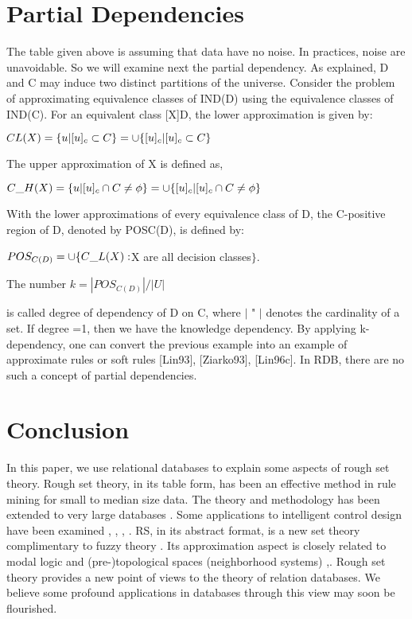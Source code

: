 \documentclass[12pt]{article}
\begin{document}
\section{Partial Dependencies}
The table given above is assuming that data have no noise. In practices,  noise are unavoidable. So we will examine next the partial dependency.  As explained,  D and C may induce two distinct partitions of the universe.  Consider the problem of approximating equivalence classes of  IND(D) using the equivalence classes of IND(C).  For an equivalent class [X]D, the lower approximation is given by:

$C$\textunderscore $L (X)  = \{u \space | \space [u]_c \subset C \}  = \cup \{ [u]_c | [u]_c \subset C \}$\newline

\noindent The upper approximation of X is defined as,

$C \mbox{\textunderscore} H(X)  =  \{u \space | \space [u]_c \cap C \neq \phi \} = \cup \{ [u]_c | [u]_c  \cap C \neq \phi \}$ \newline

\noindent With the lower approximations of every equivalence class of D, the C-positive region of D, denoted by  POSC(D), is defined by:

$POS_{C(D)} = \cup \{ C \mbox{\textunderscore} L(X) : $X are all decision classes$\}$. \newline

\noindent The number 
$k = | POS_{C(D)} | / |U|$

is called degree of dependency of D on C, where $|$ " $|$ denotes the cardinality of a set.  If degree =1, then we have the knowledge dependency. By applying k-dependency, one can convert the previous example into an example of approximate rules or soft rules [Lin93], [Ziarko93], [Lin96c]. In RDB, there are no such a concept of partial dependencies.

\section{Conclusion}
In this paper, we use relational databases to explain some aspects of rough set theory.  Rough set theory, in its table form, has been an effective method in rule mining for small to median size data. The theory and methodology has been extended to very large databases \cite{Lin96b}. Some applications to intelligent control design have been examined \cite{Lin96a}, \cite{Lin96b}, \cite{Mrozek96}, \cite{Munakata96}. RS, in its abstract format, is a new set theory complimentary to fuzzy theory \cite{Zimmermann91}. Its approximation aspect is closely related to modal logic and (pre-)topological spaces (neighborhood systems) \cite{Chellas80},\cite{Lin88}. Rough set theory provides a new point of views to the theory of relation databases. We believe some profound applications in databases through this view may soon be flourished.
\end{document}
